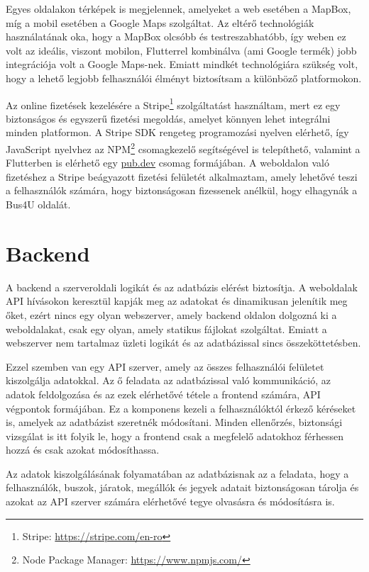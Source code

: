 Egyes oldalakon térképek is megjelennek, amelyeket a web esetében a MapBox, míg a mobil esetében a Google Maps szolgáltat. Az eltérő technológiák használatának oka, hogy a MapBox olcsóbb és testreszabhatóbb, így weben ez volt az ideális, viszont mobilon, Flutterrel kombinálva (ami Google termék) jobb integrációja volt a Google Maps-nek. Emiatt mindkét technológiára szükség volt, hogy a lehető legjobb felhasználói élményt biztosítsam a különböző platformokon.

Az online fizetések kezelésére a Stripe\footnote{Stripe: \url{https://stripe.com/en-ro}} szolgáltatást használtam, mert ez egy biztonságos és egyszerű fizetési megoldás, amelyet könnyen lehet integrálni minden platformon. A Stripe SDK rengeteg programozási nyelven elérhető, így JavaScript nyelvhez az NPM\footnote{Node Package Manager: \url{https://www.npmjs.com/}} csomagkezelő segítségével is telepíthető, valamint a Flutterben is elérhető egy \url{pub.dev} csomag formájában. A weboldalon való fizetéshez a Stripe beágyazott fizetési felületét alkalmaztam, amely lehetővé teszi a felhasználók számára, hogy biztonságosan fizessenek anélkül, hogy elhagynák a Bus4U oldalát.

\section{Backend}
A backend a szerveroldali logikát és az adatbázis elérést biztosítja. A weboldalak API hívásokon keresztül kapják meg az adatokat és dinamikusan jelenítik meg őket, ezért nincs egy olyan webszerver, amely backend oldalon dolgozná ki a weboldalakat, csak egy olyan, amely statikus fájlokat szolgáltat. Emiatt a webszerver nem tartalmaz üzleti logikát és az adatbázissal sincs összeköttetésben.

Ezzel szemben van egy API szerver, amely az összes felhasználói felületet kiszolgálja adatokkal. Az ő feladata az adatbázissal való kommunikáció, az adatok feldolgozása és az ezek elérhetővé tétele a frontend számára, API végpontok formájában. Ez a komponens kezeli a felhasználóktól érkező kéréseket is, amelyek az adatbázist szeretnék módosítani. Minden ellenőrzés, biztonsági vizsgálat is itt folyik le, hogy a frontend csak a megfelelő adatokhoz férhessen hozzá és csak azokat módosíthassa. 

Az adatok kiszolgálásának folyamatában az adatbázisnak az a feladata, hogy a felhasználók, buszok, járatok, megállók és jegyek adatait biztonságosan tárolja és azokat az API szerver számára elérhetővé tegye olvasásra és módosításra is.

